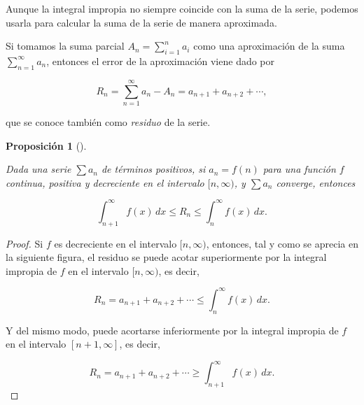 \documentclass[
  a4paper,
]{scrreport}
\theoremstyle{definition}
\theoremstyle{plain}
\theoremstyle{definition}
\theoremstyle{definition}
\theoremstyle{plain}
\theoremstyle{plain}
\newtheorem{proposition}{Proposición}[chapter]
\theoremstyle{remark}
\begin{document}
Aunque la integral impropia no siempre coincide con la suma de la serie,
podemos usarla para calcular la suma de la serie de manera aproximada.

Si tomamos la suma parcial \(A_n = \sum_{i=1}^n a_i\) como una
aproximación de la suma \(\sum_{n=1}^\infty a_n\), entonces el error de
la aproximación viene dado por

\[
R_n = \sum_{n=1}^\infty a_n - A_n= a_{n+1}+a_{n+2}+\cdots,
\]

que se conoce también como \emph{residuo} de la serie.

\begin{proposition}[]\protect\hypertarget{prp-residuo-acotado}{}\label{prp-residuo-acotado}

Dada una serie \(\sum a_n\) de términos positivos, si \(a_n=f(n)\) para
una función \(f\) continua, positiva y decreciente en el intervalo
\([n,\infty)\), y \(\sum a_n\) converge, entonces

\[
\int_{n+1}^\infty f(x)\,dx \leq R_n \leq \int_n^\infty f(x)\,dx.
\]

\end{proposition}

\begin{tcolorbox}[enhanced jigsaw, leftrule=.75mm, colbacktitle=quarto-callout-note-color!10!white, toprule=.15mm, opacityback=0, opacitybacktitle=0.6, toptitle=1mm, breakable, bottomtitle=1mm, colframe=quarto-callout-note-color-frame, rightrule=.15mm, titlerule=0mm, title=\textcolor{quarto-callout-note-color}{\faInfo}\hspace{0.5em}{Demostración}, arc=.35mm, left=2mm, bottomrule=.15mm, colback=white, coltitle=black]

\begin{proof}
Si \(f\) es decreciente en el intervalo \([n,\infty)\), entonces, tal y
como se aprecia en la siguiente figura, el residuo se puede acotar
superiormente por la integral impropia de \(f\) en el intervalo
\([n,\infty)\), es decir,

\[
R_n = a_{n+1}+a_{n+2}+\cdots \leq \int_n^\infty f(x)\,dx.
\]

Y del mismo modo, puede acortarse inferiormente por la integral impropia
de \(f\) en el intervalo \([n+1,\infty]\), es decir,

\[
R_n = a_{n+1}+a_{n+2}+\cdots \geq \int_{n+1}^\infty f(x)\,dx.
\]
\end{proof}

\end{tcolorbox}
\end{document}
